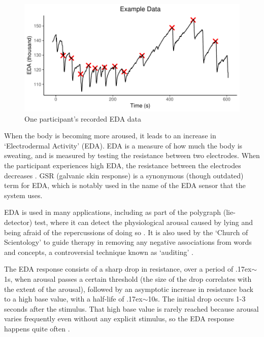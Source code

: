 \documentclass[12pt,a4paper]{article}\usepackage[]{graphicx}\usepackage[]{color}
\makeatletter
\def\maxwidth{ %
  \ifdim\Gin@nat@width>\linewidth
    \linewidth
  \else
    \Gin@nat@width
  \fi
}
\makeatother
\begin{document}
\begin{figure}[htb]


{\centering \includegraphics[width=\maxwidth]{figure/ExampleEda-1} 

}



	\caption{One participant's recorded EDA data}
	\label{fig:ExampleEda}
\end{figure}

When the body is becoming more aroused, it leads to an increase in `Electrodermal Activity' (EDA).
EDA is a measure of how much the body is sweating, and is measured by testing the resistance between two electrodes.
When the participant experiences high EDA, the resistance between the electrodes decreases \citep[pp. 2--3]{eda}.
GSR (galvanic skin response) is a synonymous (though outdated) term for EDA, which is notably used in the name of the EDA sensor that the system uses.

EDA is used in many applications, including as part of the polygraph (lie-detector) test, where it can detect the physiological arousal caused by lying and being afraid of the repercussions of doing so \citep{polygraph}.
It is also used by the `Church of Scientology' to guide therapy in removing any negative associations from words and concepts, a controversial technique known as `auditing' \citep[p.32]{auditing}.

The EDA response consists of a sharp drop in resistance, over a period of {\raise.17ex\hbox{$\scriptstyle\sim$}}1s, when arousal passes a certain threshold (the size of the drop correlates with the extent of the arousal), followed by an asymptotic increase in resistance back to a high base value, with a half-life of {\raise.17ex\hbox{$\scriptstyle\sim$}}10s.
The initial drop occurs 1-3 seconds after the stimulus.
That high base value is rarely reached because arousal varies frequently even without any explicit stimulus, so the EDA response happens quite often \citep{edaAnalysis}.
\end{document}
